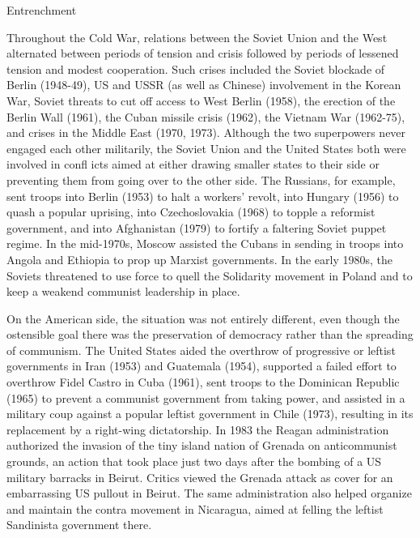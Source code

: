 \documentclass[
  openany]{book}
\begin{document}
Entrenchment

Throughout the Cold War, relations between the Soviet Union and the West alternated between periods of tension and crisis followed by periods of lessened tension and modest cooperation. Such crises included the Soviet blockade of Berlin (1948-49), US and USSR (as well as Chinese) involvement in the Korean War, Soviet threats to cut off access to West Berlin (1958), the erection of the Berlin Wall (1961), the Cuban missile crisis (1962), the Vietnam War (1962-75), and crises in the Middle East (1970, 1973). Although the two superpowers never engaged each other militarily, the Soviet Union and the United States both were involved in confl icts aimed at either drawing smaller states to their side or preventing them from going over to the other side. The Russians, for example, sent troops into Berlin (1953) to halt a workers' revolt, into Hungary (1956) to quash a popular uprising, into Czechoslovakia (1968) to topple a reformist government, and into Afghanistan (1979) to fortify a faltering Soviet puppet regime. In the mid-1970s, Moscow assisted the Cubans in sending in troops into Angola and Ethiopia to prop up Marxist governments. In the early 1980s, the Soviets threatened to use force to quell the Solidarity movement in Poland and to keep a weakend communist leadership in place.

On the American side, the situation was not entirely different, even though the ostensible goal there was the preservation of democracy rather than the spreading of communism. The United States aided the overthrow of progressive or leftist governments in Iran (1953) and Guatemala (1954), supported a failed effort to overthrow Fidel Castro in Cuba (1961), sent troops to the Dominican Republic (1965) to prevent a communist government from taking power, and assisted in a military coup against a popular leftist government in Chile (1973), resulting in its replacement by a right-wing dictatorship. In 1983 the Reagan administration authorized the invasion of the tiny island nation of Grenada on anticommunist grounds, an action that took place just two days after the bombing of a US military barracks in Beirut. Critics viewed the Grenada attack as cover for an embarrassing US pullout in Beirut. The same administration also helped organize and maintain the contra movement in Nicaragua, aimed at felling the leftist Sandinista government there.
\end{document}
